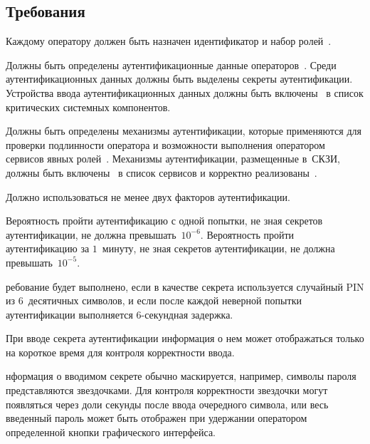 \subsection{Требования}\label{IA.Reqs}

\label{R.IA.Id} %
Каждому оператору должен быть назначен идентификатор и набор 
ролей~.

\label{R.IA.AuthData} %
Должны быть определены аутентификационные данные операторов~.
% 
Среди аутентификационных данных должны быть выделены 
секреты аутентификации.
%
Устройства ввода аутентификационных данных должны быть
включены~ в список критических системных компонентов. 

\label{R.IA.Auth} %
Должны быть определены механизмы аутентификации, которые применяются для
проверки подлинности оператора и возможности выполнения оператором сервисов
явных ролей~.
%
Механизмы аутентификации, размещенные в~СКЗИ, должны быть
включены~ в список сервисов и корректно
реализованы~.

\label{R.IA.2FA} %
Должно использоваться не менее двух факторов аутентификации.

\label{R.IA.AuthStrength} %
Вероятность пройти аутентификацию с одной попытки, не зная секретов
аутентификации, не должна превышать~$10^{-6}$.
%
Вероятность пройти аутентификацию за $1$~минуту, не зная секретов 
аутентификации, не должна превышать~$10^{-5}$.

\begin{note*}
ребование будет выполнено, если в качестве секрета используется 
случайный PIN из $6$~десятичных символов, и если после каждой неверной попытки 
аутентификации выполняется $6$-секундная задержка.
\end{note*}

\label{R.IA.PwdMask} %
При вводе секрета аутентификации информация о нем может отображаться только на 
короткое время для контроля корректности ввода.

\begin{note*}
нформация о вводимом секрете обычно маскируется, например, символы 
пароля представляются звездочками. Для контроля корректности звездочки могут 
появляться через доли секунды после ввода очередного символа, или весь 
введенный пароль может быть отображен при удержании оператором определенной 
кнопки графического интерфейса.
\end{note*}

